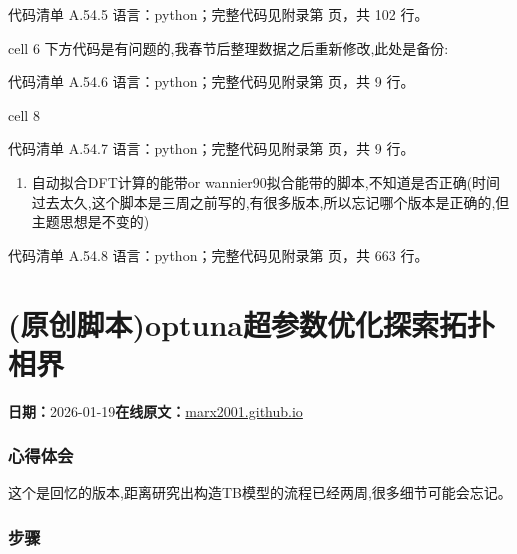 \documentclass[lang=cn,scheme=chinese,color=blue,device=normal,toc=onecol,math=cm]{elegantbook}
\begin{document}
\begin{codeindexbox}{代码清单 A.54.5}
语言：python；完整代码见附录第 \pageref{code:54:5} 页，共 102 行。
\end{codeindexbox}


cell 6 下方代码是有问题的,我春节后整理数据之后重新修改,此处是备份:\par


\begin{codeindexbox}{代码清单 A.54.6}
语言：python；完整代码见附录第 \pageref{code:54:6} 页，共 9 行。
\end{codeindexbox}


cell 8\par


\begin{codeindexbox}{代码清单 A.54.7}
语言：python；完整代码见附录第 \pageref{code:54:7} 页，共 9 行。
\end{codeindexbox}


\begin{enumerate}
\item 自动拟合DFT计算的能带or wannier90拟合能带的脚本,不知道是否正确(时间过去太久,这个脚本是三周之前写的,有很多版本,所以忘记哪个版本是正确的,但主题思想是不变的)
\end{enumerate}


\begin{codeindexbox}{代码清单 A.54.8}
语言：python；完整代码见附录第 \pageref{code:54:8} 页，共 663 行。
\end{codeindexbox}



\section{(原创脚本)optuna超参数优化探索拓扑相界}
\begin{articlemeta}
\textbf{日期：}2026-01-19\hfill\textbf{在线原文：}\href{https://marx2001.github.io/sci-note\_posts/20260119-optuna}{marx2001.github.io}
\end{articlemeta}

\subsubsection{心得体会}


这个是回忆的版本,距离研究出构造TB模型的流程已经两周,很多细节可能会忘记。\par


\subsubsection{步骤}
\end{document}
